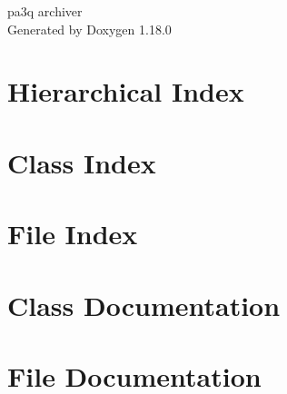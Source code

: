 \documentclass[twoside]{book}
\newcommand{\+}{\discretionary{\mbox{\scriptsize$\hookleftarrow$}}{}{}}
\newcommand{\clearemptydoublepage}{%
    \newpage{\pagestyle{empty}\cleardoublepage}%
  }
\begin{document}
  \raggedbottom
    \hypersetup{pageanchor=false,
                bookmarksnumbered=true,
                pdfencoding=unicode
               }
  \begin{titlepage}
  \vspace*{7cm}
  \begin{center}%
  {\Large pa3q archiver}\\
  \vspace*{1cm}
  {\large Generated by Doxygen 1.18.0}\\
  \end{center}
  \end{titlepage}
  \clearemptydoublepage
  \tableofcontents
  \clearemptydoublepage
  \hypersetup{pageanchor=true}
\chapter{Hierarchical Index}

\chapter{Class Index}

\chapter{File Index}

\chapter{Class Documentation}




\chapter{File Documentation}














  \backmatter
  \newpage
  \clearemptydoublepage
  \printindex
\end{document}
